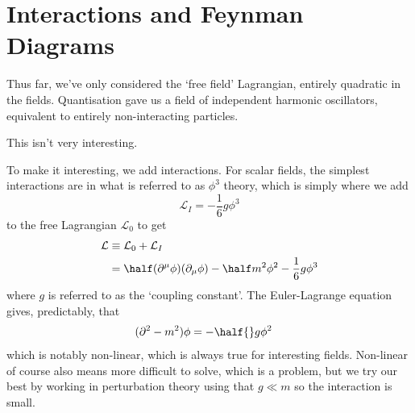 \documentclass[notes.tex]{subfiles}
\begin{document}
\chapter{Interactions and Feynman Diagrams}
\label{chap:rqft_interactions}
Thus far, we've only considered the `free field' Lagrangian, entirely quadratic in the fields. Quantisation gave us a field of independent harmonic oscillators, equivalent to entirely non-interacting particles.

This isn't very interesting.

To make it interesting, we add interactions. For scalar fields, the simplest interactions are in what is referred to as $\phi^3$ theory, which is simply where we add \[\mathcal{L}_I = -\frac{1}{6} g \phi^3\] to the free Lagrangian $\mathcal{L}_0$ to get
\begin{align*}
    \mathcal{L} &\equiv \mathcal{L}_0 + \mathcal{L}_I\\
    &= \half(\partial^\mu\phi)(\partial_\mu\phi) - \half m^2\phi^2 - \frac{1}{6}g\phi^3
\end{align*}
where $g$ is referred to as the `coupling constant'.
The Euler-Lagrange equation gives, predictably, that
\begin{align*}
    (\partial^2 - m^2)\phi &= -\half{}g\phi^2
\end{align*}
which is notably non-linear, which is always true for interesting fields.
Non-linear of course also means more difficult to solve, which is a problem, but we try our best by working in perturbation theory using that $g\ll m$ so the interaction is small.
\end{document}
